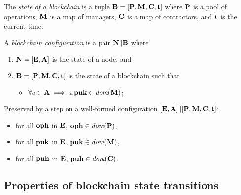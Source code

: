 \documentclass[a4paper]{llncs}
\begin{document}
\begin{definition}%
  The \emph{state of a blockchain} is a tuple
  $\textbf{B} = [\textbf{P}, \textbf{M}, \textbf{C}, \textbf{t}]$ where
  $\textbf{P}$ is a pool of operations, $\textbf{M}$ is a map of managers,
  $\textbf{C}$ is a map of contractors, and $\textbf{t}$ is the current
  time. 
\end{definition}
\begin{definition}%
A \emph{blockchain configuration} is a pair
$ \textbf{N} \| \textbf{B}$ where
\begin{enumerate}
\item $\textbf{N} = [\textbf{E}, \textbf{A}]$ is the state of a node, and
\item $\textbf{B} = [\textbf{P}, \textbf{M}, \textbf{C},
  \textbf{t}]$ is the state of a blockchain  
  such that
  \begin{itemize}
  \item
    $\forall a \in \textbf{A} \implies a.\textbf{puk} \in \textit{dom}( \textbf{M})$;
  \end{itemize}
\end{enumerate}
\end{definition}
\begin{definition}
  Preserved by a step on a well-formed configuration $ [\textbf{E}, \textbf{A}] \|
  [\textbf{P}, \textbf{M}, \textbf{C}, \textbf{t}]$:
  \begin{itemize}
  \item for all $\textbf{oph}$ in $\textbf{E}$, $\textbf{oph} \in \textit{dom} (\textbf{P})$,
  \item for all $\textbf{puk}$ in $\textbf{E}$, $\textbf{puk} \in \textit{dom} (\textbf{M})$,
  \item for all $\textbf{puh}$ in $\textbf{E}$, $\textbf{puh} \in \textit{dom} (\textbf{C})$.
  \end{itemize}
\end{definition}

\clearpage{}
\subsection{Properties of blockchain state transitions}
\end{document}
